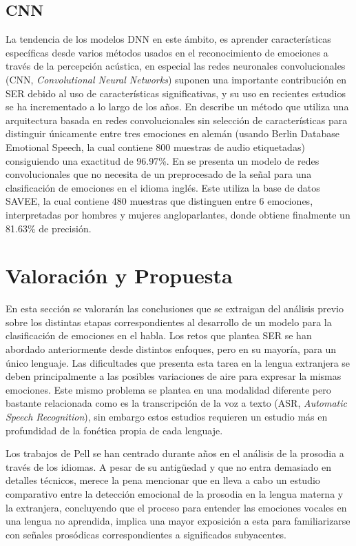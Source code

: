 \documentclass[11pt,a4paper,spanish]{book}
\begin{document}
	\subsection{CNN}
	La tendencia de los modelos DNN en este ámbito, es aprender características específicas desde varios métodos usados en el reconocimiento de emociones a través de la percepción acústica, en especial las redes neuronales convolucionales (CNN, \emph{Convolutional Neural Networks}) suponen una importante contribución en SER debido al uso de características significativas, y su uso en recientes estudios se ha incrementado a lo largo de los años.
	En \cite{Harar2017} describe un método que utiliza una arquitectura basada en redes convolucionales sin selección de características para distinguir únicamente entre tres emociones en alemán (usando Berlin Database Emotional Speech, la cual contiene 800 muestras de audio etiquetadas) consiguiendo una exactitud de 96.97\%. En \cite{AbdulQayyum2019} se presenta un modelo de redes convolucionales que no necesita de un preprocesado de la señal para una clasificación de emociones en el idioma inglés. Este utiliza la base de datos SAVEE, la cual contiene 480 muestras que distinguen entre 6 emociones, interpretadas por hombres y mujeres angloparlantes, donde obtiene finalmente un 81.63\% de precisión.
	
	
	\section{Valoración y Propuesta}
	En esta sección se valorarán las conclusiones que se extraigan del análisis previo sobre los distintas etapas correspondientes al desarrollo de un modelo para la clasificación de emociones en el habla. Los retos que plantea SER se han abordado anteriormente desde distintos enfoques, pero en su mayoría, para un único lenguaje. Las dificultades que presenta esta tarea en la lengua extranjera se deben principalmente a las posibles variaciones de aire para expresar la mismas emociones. Este mismo problema se plantea en una modalidad diferente pero bastante relacionada como es la transcripción de la voz a texto (ASR, \emph{Automatic Speech Recognition}), sin embargo estos estudios requieren un estudio más en profundidad de la fonética propia de cada lenguaje.
	
	Los trabajos de Pell se han centrado durante años en el análisis de la prosodia a través de los idiomas. A pesar de su antigüedad y que no entra demasiado en detalles técnicos, merece la pena mencionar que en \cite{Pell2008} lleva a cabo un estudio comparativo entre la detección emocional de la prosodia en la lengua materna y la extranjera, concluyendo que el proceso para entender las emociones vocales en una lengua no aprendida, implica una mayor exposición a esta para familiarizarse con señales prosódicas correspondientes a significados subyacentes.
	
\end{document}
